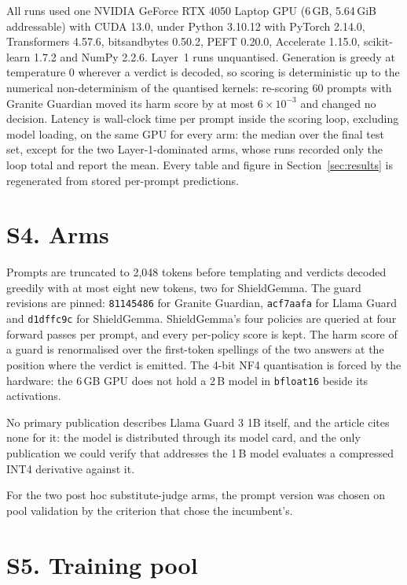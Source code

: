 \documentclass[journal]{IEEEtran}
\begin{document}
All runs used one NVIDIA GeForce RTX 4050 Laptop GPU (6\,GB, 5.64\,GiB
addressable) with CUDA 13.0, under Python 3.10.12 with
PyTorch 2.14.0, Transformers 4.57.6, bitsandbytes 0.50.2, PEFT 0.20.0,
Accelerate 1.15.0, scikit-learn 1.7.2 and NumPy 2.2.6. Layer~1 runs
unquantised. Generation is greedy at temperature 0 wherever a verdict is
decoded, so scoring is deterministic up to the numerical non-determinism of the
quantised kernels: re-scoring 60 prompts with Granite Guardian moved its harm
score by at most $6\times10^{-3}$ and changed no decision. Latency is
wall-clock time per prompt inside the scoring loop, excluding model loading, on
the same GPU for every arm: the median over the final test set, except for the
two Layer-1-dominated arms, whose runs recorded only the loop total and report
the mean. Every table and figure in
Section~\ref{sec:results} is regenerated from stored per-prompt predictions.

\section*{S4. Arms}

Prompts are truncated to 2{,}048 tokens before templating and verdicts decoded
greedily with at most eight new tokens, two for ShieldGemma. The guard
revisions are pinned: \texttt{81145486} for Granite Guardian,
\texttt{acf7aafa} for Llama Guard and \texttt{d1dffc9c} for ShieldGemma.
ShieldGemma's four policies are queried at four forward passes per prompt, and
every per-policy score is kept. The harm score of a guard is renormalised over
the first-token spellings of the two answers at the position where the verdict
is emitted. The 4-bit NF4 quantisation is forced by the hardware: the 6\,GB GPU
does not hold a 2\,B model in \texttt{bfloat16} beside its activations.

No primary publication describes Llama Guard 3 1B itself, and the article cites
none for it: the model is distributed through its model card, and the only
publication we could verify that addresses the 1\,B model evaluates a
compressed INT4 derivative against it.

For the two post hoc substitute-judge arms, the prompt version was chosen on
pool validation by the criterion that chose the incumbent's.

\section*{S5. Training pool}
\end{document}
